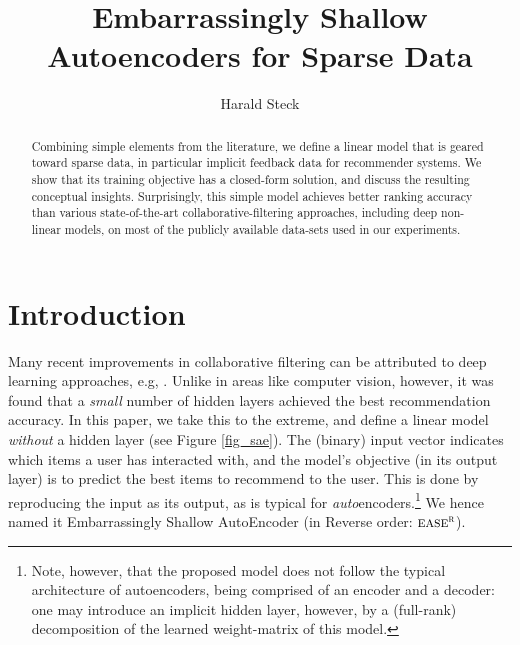 \documentclass[sigconf]{acmart}
\newcommand{\sae}{${\textsc{ease}}^{\textsc{r}}$}
\begin{document}
\title{Embarrassingly Shallow Autoencoders for Sparse Data}

\author{Harald Steck}


\begin{abstract}
Combining simple elements from the literature, we define a linear model that is geared toward  sparse data, in particular implicit feedback data for recommender systems. We show that its training objective has a closed-form solution, and discuss the resulting conceptual insights.  Surprisingly, this simple  model  achieves better ranking accuracy than  various state-of-the-art collaborative-filtering approaches, including deep non-linear models,  on most of the publicly available data-sets used in our experiments. 
\end{abstract}

 


\maketitle


\section{Introduction}
Many recent improvements in  collaborative filtering can be attributed to deep learning approaches, e.g, \cite{hidasi15,hidasi17,liang18,sedhain15, zheng16,wu16,he17,cheng16}. Unlike in areas like  computer vision, however, it was found that a  \emph{small} number of hidden layers achieved the best recommendation accuracy. In this paper, we take this to the extreme, and define a linear model \emph{without}  a hidden layer (see Figure \ref{fig_sae}). The (binary) input vector indicates which items a user has interacted with, and the model's objective (in its output layer) is to predict  the best items to recommend to the user. This is done by reproducing the input as its output, as is typical for  \emph{auto}encoders.\footnote{Note, however, that the proposed model  does not follow the typical architecture of autoencoders, being comprised of an encoder and a decoder: one may introduce an implicit  hidden layer, however, by a (full-rank) decomposition of the learned weight-matrix of this model.}
 We hence  named it Embarrassingly Shallow AutoEncoder (in Reverse order: \sae{}).
\end{document}
